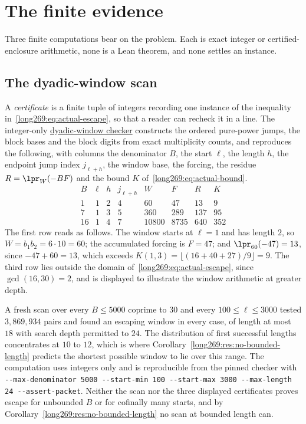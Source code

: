 \statusboundary

\section{The finite evidence}\label{long269:sec:evidence}

Three finite computations bear on the problem.  Each is exact integer or
certified-enclosure arithmetic, none is a Lean theorem, and none settles an
instance.

\subsection{The dyadic-window scan}

A \emph{certificate} is a finite tuple of integers recording one instance of
the inequality in~\eqref{long269:eq:actual-escape}, so that a reader can recheck it in
a line.  The integer-only
\href{\sourceurl/scripts/check_erdos269_dyadic_windows.py}{dyadic-window
checker} constructs the ordered pure-power jumps, the block bases and the block
digits from exact multiplicity counts, and reproduces the following, with
columns the denominator $B$, the start $\ell$, the length $h$, the endpoint
jump index $j_{\ell+h}$, the window base, the forcing, the residue
$R=\lpr_{W}(-BF)$ and the bound $K$ of~\eqref{long269:eq:actual-bound}.
\[
\begin{array}{c|c|c|c|r|r|r|r}
B&\ell&h&j_{\ell+h}&W&F&R&K\\ \hline
1&1&2&4&60&47&13&9\\
7&1&3&5&360&289&137&95\\
16&1&4&7&10800&8735&640&352
\end{array}
\]
The first row reads as follows.  The window starts at $\ell=1$ and has length
$2$, so $W=b_1b_2=6\cdot10=60$; the accumulated forcing is $F=47$; and
$\lpr_{60}(-47)=13$, since $-47+60=13$, which exceeds
$K(1,3)=\lfloor(16+40+27)/9\rfloor=9$.  The third row lies outside the domain
of~\eqref{long269:eq:actual-escape}, since $\gcd(16,30)=2$, and is displayed to
illustrate the window arithmetic at greater depth.

A fresh scan over every $B\le5000$ coprime to $30$ and every $100\le\ell\le3000$
tested $3{,}869{,}934$ pairs and found an escaping window in every case, of
length at most $18$ with search depth permitted to $24$.  The distribution of
first successful lengths concentrates at $10$ to $12$, which is where
Corollary~\ref{long269:res:no-bounded-length} predicts the shortest possible window to
lie over this range.  The computation uses integers only and is reproducible
from the pinned checker with
\texttt{-{}-max-denominator 5000 -{}-start-min 100 -{}-start-max 3000
-{}-max-length 24 -{}-assert-packet}.  Neither the scan nor the three displayed
certificates proves escape for unbounded $B$ or for cofinally many starts, and
by Corollary~\ref{long269:res:no-bounded-length} no scan at bounded length can.

